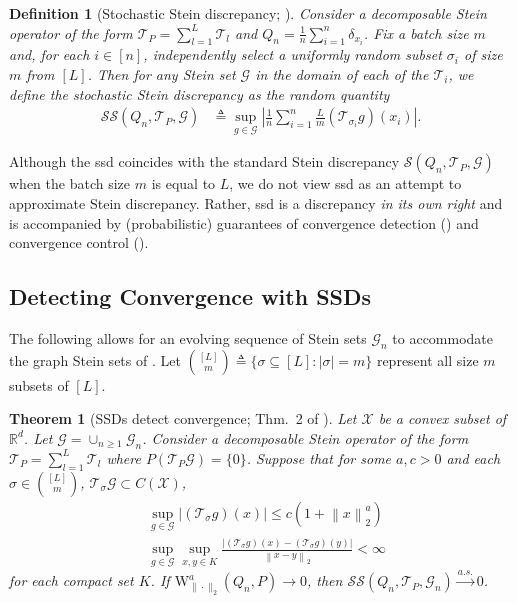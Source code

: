 \documentclass[12pt,paper=letter]{scrreprt}
\newtheorem{theorem}{Theorem}[chapter]
\newtheorem{definition}{Definition}[chapter]
\def\defeq{\triangleq} %
\def\norm#1{\left\|{#1}\right\|} %
\newcommand{\twonorm}[1]{\norm{#1}_2} %
\newcommand{\toas}{\stackrel{a.s.}{\to}}
\newcommand{\xset}[0]{\mathcal{X}} %
\newcommand{\gset}[0]{\mathcal{G}} %
\newcommand{\sset}{\sigma} %
\newcommand{\equisubs}[2]{{[#1]\choose #2}}
\newcommand{\opsub}[1]{\mathcal{T}_{#1}} %
\newcommand{\opsubarg}[3]{(\opsub{#1}{#2})({#3})} %
\begin{document}
\begin{definition}[Stochastic Stein discrepancy; \citealp{gorham2020stochastic}]
Consider a decomposable Stein operator of the form $\mathcal{T}_P = \sum_{l=1}^L \mathcal{T}_l$ and $Q_n = \frac{1}{n} \sum_{i=1}^n \delta_{x_i}$.
Fix a batch size $m$ and, for each $i \in [n]$, independently select a uniformly random subset $\sset_i$ of size $m$ from $[L]$. 
Then for any Stein set $\gset$ in the domain of each of the $\mathcal{T}_i$, we define the \emph{stochastic Stein discrepancy} as the random quantity
\begin{align}\label{ssd_subset}
    \mathcal{SS}(Q_n , \mathcal{T}_P , \mathcal{G}) 
        &\defeq \sup_{g\in\gset}\left |\frac{1}{n}\sum_{i=1}^n
    \frac{L}{m}\opsubarg{\sset_i}{g}{x_i}\right |.
\end{align}
\end{definition}


Although the \ac{ssd} coincides with the standard Stein discrepancy $\mathcal{S}(Q_n , \mathcal{T}_P , \mathcal{G})$ when the batch size $m$ is equal to $L$, we do not view \ac{ssd} as an attempt to approximate Stein discrepancy.
Rather, \ac{ssd} is a discrepancy \emph{in its own right} and is accompanied by (probabilistic) guarantees of convergence detection () and convergence control ().





\subsection{Detecting Convergence with SSDs}
\label{subsec: detect SSD}

The following allows for an evolving sequence of Stein sets $\mathcal{G}_n$ to accommodate the graph Stein sets of \citet{gorham2015measuring,Gorham2019}.
Let $\equisubs{L}{m} \defeq\{\sset\subseteq [L] : |\sset| = m\}$  represent all size $m$ subsets of $[L]$.


\begin{theorem}[SSDs detect convergence; Thm.~2 of \citealp{gorham2020stochastic}]
\label{ssds-detect-convergence}
Let $\mathcal{X}$ be a convex subset of $\mathbb{R}^d$.
Let $\mathcal{G} = \cup_{n \geq 1} \mathcal{G}_n$.
Consider a decomposable Stein operator of the form $\mathcal{T}_P = \sum_{l=1}^L \mathcal{T}_l$ where $P(\mathcal{T}_P \mathcal{G}) = \{0\}$.
Suppose that for some $a, c > 0$ and each $\sset\in\equisubs{L}{m}$, $\mathcal{T}_\sigma \mathcal{G} \subset C(\xset)$,
\begin{align*}
& \sup_{g \in \mathcal{G}} |\opsubarg{\sset}{g}{x}| \leq c(1+\twonorm{x}^a) \\
& \sup_{g \in \mathcal{G}} \sup_{x,y \in K} \frac{|\opsubarg{\sset}{g}{x} - \opsubarg{\sset}{g}{y}|}{\twonorm{x-y}} < \infty
\end{align*}
for each compact set $K$.
If $\mathrm{W}_{\|\cdot\|_2}^a(Q_n, P) \to 0$, then $\mathcal{SS}(Q_n , \mathcal{T}_P , \mathcal{G}_n) \toas 0$. 
\end{theorem}
\end{document}
